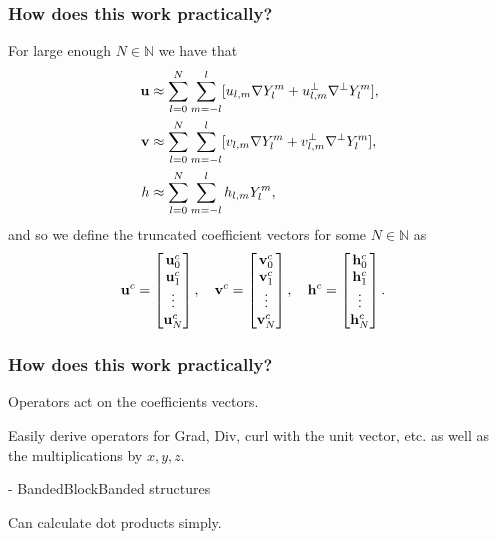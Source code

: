 \documentclass[10pt]{beamer}
\newcommand{\N}{\mathbb{N}}
\newcommand{\Ylm}{Y^m_l}
\newcommand{\gradYlm}{\nabla Y^m_l}
\newcommand{\gradpYlm}{\nabla^\perp Y^m_l}
\begin{document}
\frame
{
    \frametitle{How does this work practically?}

For large enough \(N \in \N\) we have that
\begin{align}
\bold{u} &\approx \sum_{l=0}^{N} \sum_{m=-l}^{l} [ u_{l,m} \gradYlm + u^{\perp}_{l,m} \gradpYlm ], \\
\bold{v} &\approx \sum_{l=0}^{N} \sum_{m=-l}^{l} [ v_{l,m} \gradYlm + v^{\perp}_{l,m} \gradpYlm ], \\
h &\approx \sum_{l=0}^{N} \sum_{m=-l}^{l} h_{l,m} \Ylm,
\end{align}
and so we define the truncated coefficient vectors for some \(N \in \N\) as
\begin{align}
\bold{u}^c &= \begin{bmatrix}
			\bold{u}_0^c \\
			\bold{u}_1^c \\
			\vdots \\
			\bold{u}_N^c
		    \end{bmatrix},
\quad
\bold{v}^c = \begin{bmatrix}
			\bold{v}_0^c \\
			\bold{v}_1^c \\
			\vdots \\
			\bold{v}_N^c
		    \end{bmatrix},
\quad
\bold{h}^c = \begin{bmatrix}
			\bold{h}_0^c \\
			\bold{h}_1^c \\
			\vdots \\
			\bold{h}_N^c
		    \end{bmatrix}.		  
\end{align}

}

\frame
{
    \frametitle{How does this work practically?}
 
Operators act on the coefficients vectors.

Easily derive operators for Grad, Div, curl with the unit vector, etc. as well as the multiplications by $x, y, z$.

- BandedBlockBanded structures

Can calculate dot products simply.
    
}
\end{document}
